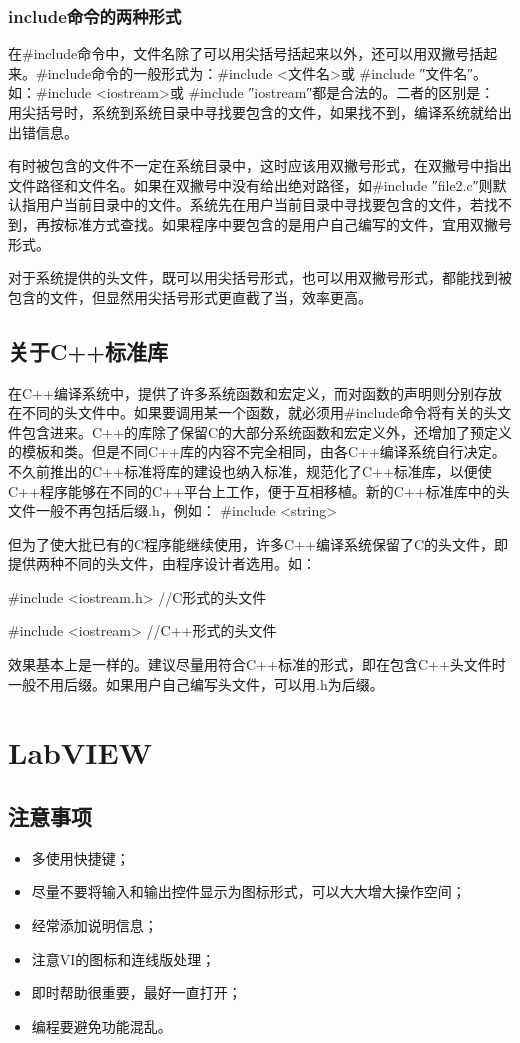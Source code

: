 \subsection{include命令的两种形式}
在\#include命令中，文件名除了可以用尖括号括起来以外，还可以用双撇号括起来。\#include命令的一般形式为：\#include <文件名>或 \#include ″文件名″。如：\#include <iostream>或 \#include ″iostream″都是合法的。二者的区别是： 用尖括号时，系统到系统目录中寻找要包含的文件，如果找不到，编译系统就给出出错信息。

有时被包含的文件不一定在系统目录中，这时应该用双撇号形式，在双撇号中指出文件路径和文件名。如果在双撇号中没有给出绝对路径，如\#include ″file2.c″则默认指用户当前目录中的文件。系统先在用户当前目录中寻找要包含的文件，若找不到，再按标准方式查找。如果程序中要包含的是用户自己编写的文件，宜用双撇号形式。

对于系统提供的头文件，既可以用尖括号形式，也可以用双撇号形式，都能找到被包含的文件，但显然用尖括号形式更直截了当，效率更高。


\section{关于C++标准库}
在C++编译系统中，提供了许多系统函数和宏定义，而对函数的声明则分别存放在不同的头文件中。如果要调用某一个函数，就必须用\#include命令将有关的头文件包含进来。C++的库除了保留C的大部分系统函数和宏定义外，还增加了预定义的模板和类。但是不同C++库的内容不完全相同，由各C++编译系统自行决定。不久前推出的C++标准将库的建设也纳入标准，规范化了C++标准库，以便使C++程序能够在不同的C++平台上工作，便于互相移植。新的C++标准库中的头文件一般不再包括后缀.h，例如：  \#include <string>

但为了使大批已有的C程序能继续使用，许多C++编译系统保留了C的头文件，即提供两种不同的头文件，由程序设计者选用。如：

    \#include <iostream.h>  //C形式的头文件

    \#include <iostream>  //C++形式的头文件

效果基本上是一样的。建议尽量用符合C++标准的形式，即在包含C++头文件时一般不用后缀。如果用户自己编写头文件，可以用.h为后缀。




\chapter{LabVIEW}
\section{注意事项}
\begin{itemize}
\item 多使用快捷键；
\item 尽量不要将输入和输出控件显示为图标形式，可以大大增大操作空间；
\item 经常添加说明信息；
\item 注意VI的图标和连线版处理；
\item 即时帮助很重要，最好一直打开；
\item 编程要避免功能混乱。
\end{itemize}



